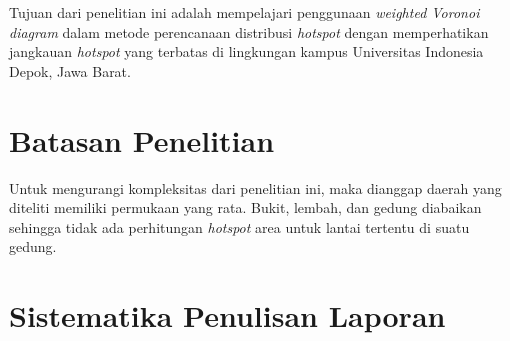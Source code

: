  

Tujuan dari penelitian ini adalah mempelajari penggunaan \textit{weighted Voronoi diagram} dalam metode perencanaan distribusi \textit{hotspot} dengan memperhatikan jangkauan \textit{hotspot} yang terbatas di lingkungan kampus Universitas Indonesia Depok, Jawa Barat.

\section{Batasan Penelitian}

Untuk mengurangi kompleksitas dari penelitian ini, maka dianggap daerah yang diteliti memiliki permukaan yang rata. Bukit, lembah, dan gedung diabaikan sehingga tidak ada perhitungan \textit{hotspot} area untuk lantai tertentu di suatu gedung.

\section{Sistematika Penulisan Laporan}

